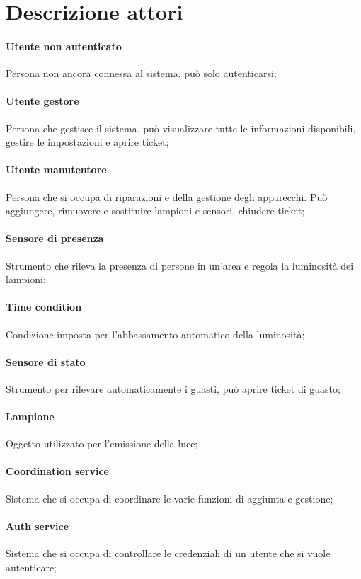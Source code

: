 \section{Descrizione attori}
    \paragraph{Utente non autenticato} 
    Persona non ancora connessa al sistema, può solo autenticarsi;
    
    \paragraph{Utente gestore} 
    Persona che gestisce il sistema, può visualizzare tutte le informazioni disponibili, gestire le impostazioni e aprire ticket;
    
    \paragraph{Utente manutentore} 
    Persona che si occupa di riparazioni e della gestione degli apparecchi. Può aggiungere, rimuovere e sostituire lampioni e sensori, chiudere ticket;
    
    \paragraph{Sensore di presenza} 
    Strumento che rileva la presenza di persone in un'area e regola la luminosità dei lampioni;
    
    \paragraph{Time condition}
    Condizione imposta per l'abbassamento automatico della luminosità;
    
    \paragraph{Sensore di stato} 
    Strumento per rilevare automaticamente i guasti, può aprire ticket di guasto;
    
    \paragraph{Lampione} 
    Oggetto utilizzato per l'emissione della luce;
    
    \paragraph{Coordination service} 
    Sistema che si occupa di coordinare le varie funzioni di aggiunta e gestione;
    
    \paragraph{Auth service} 
    Sistema che si occupa di controllare le credenziali di un utente che si vuole autenticare;
